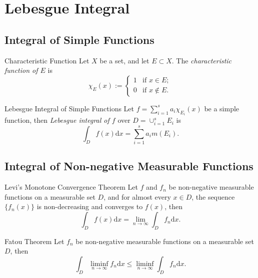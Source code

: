 

\section{Lebesgue Integral}

\subsection{Integral of Simple Functions}

\begin{definition}{Characteristic Function}{}
  Let $X$ be a set, and let $E \subset X$.
  The \emph{characteristic function of $E$} is
  \begin{equation}
    \chi_E(x) :=
    \begin{cases}
      1 & \text{if } x \in E;\\
      0 & \text{if } x \not \in E.
    \end{cases}
  \end{equation}
\end{definition}

\begin{definition}{Lebesgue Integral of Simple Functions}{}
  Let $f = \sum _{i = 1}^s a_i \chi_{E_i}(x)$ be a simple function,
  then \emph{Lebesgue integral of $f$} over $D = \cup _{i = 1}^s E_i$ is
  \begin{equation}
    \int_D f(x)\mathrm{d} x = \sum\limits_{i = 1}^s a_i m(E_i).
  \end{equation}
\end{definition}

\subsection{Integral of Non-negative Measurable Functions}

\begin{theorem}{Levi's Monotone Convergence Theorem}{}
  Let $f$ and $f_n$ be non-negative measurable functions on a measurable set
  $D$,
  and for almost every $x \in D$, the sequence $\{f_n(x)\}$ is non-decreasing
  and converges to $f(x)$, then
  \begin{equation}
    \int_D f(x)\mathrm{d} x = \lim \limits _{n \rightarrow \infty} \int_D f_n\mathrm{d} x.
  \end{equation}
\end{theorem}

\begin{theorem}{Fatou Theorem}{}
  Let $f_n$ be non-negative measurable functions on a measurable set $D$,
  then
  \begin{equation}
    \int_D \liminf \limits_{n \rightarrow \infty} f_n\mathrm{d} x
    \leq \liminf \limits_{n \rightarrow \infty} \int_D f_n\mathrm{d} x.
  \end{equation}
\end{theorem}

